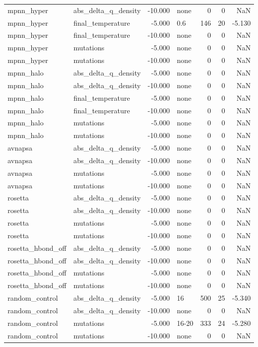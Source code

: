 \begin{table}
\begin{tabular}{llrlrrr}
mpnn\_hyper & abs\_delta\_q\_density & -10.000 & none & 0 & 0 & NaN \\
mpnn\_hyper & final\_temperature & -5.000 & 0.6 & 146 & 20 & -5.130 \\
mpnn\_hyper & final\_temperature & -10.000 & none & 0 & 0 & NaN \\
mpnn\_hyper & mutations & -5.000 & none & 0 & 0 & NaN \\
mpnn\_hyper & mutations & -10.000 & none & 0 & 0 & NaN \\
mpnn\_halo & abs\_delta\_q\_density & -5.000 & none & 0 & 0 & NaN \\
mpnn\_halo & abs\_delta\_q\_density & -10.000 & none & 0 & 0 & NaN \\
mpnn\_halo & final\_temperature & -5.000 & none & 0 & 0 & NaN \\
mpnn\_halo & final\_temperature & -10.000 & none & 0 & 0 & NaN \\
mpnn\_halo & mutations & -5.000 & none & 0 & 0 & NaN \\
mpnn\_halo & mutations & -10.000 & none & 0 & 0 & NaN \\
avnapsa & abs\_delta\_q\_density & -5.000 & none & 0 & 0 & NaN \\
avnapsa & abs\_delta\_q\_density & -10.000 & none & 0 & 0 & NaN \\
avnapsa & mutations & -5.000 & none & 0 & 0 & NaN \\
avnapsa & mutations & -10.000 & none & 0 & 0 & NaN \\
rosetta & abs\_delta\_q\_density & -5.000 & none & 0 & 0 & NaN \\
rosetta & abs\_delta\_q\_density & -10.000 & none & 0 & 0 & NaN \\
rosetta & mutations & -5.000 & none & 0 & 0 & NaN \\
rosetta & mutations & -10.000 & none & 0 & 0 & NaN \\
rosetta\_hbond\_off & abs\_delta\_q\_density & -5.000 & none & 0 & 0 & NaN \\
rosetta\_hbond\_off & abs\_delta\_q\_density & -10.000 & none & 0 & 0 & NaN \\
rosetta\_hbond\_off & mutations & -5.000 & none & 0 & 0 & NaN \\
rosetta\_hbond\_off & mutations & -10.000 & none & 0 & 0 & NaN \\
random\_control & abs\_delta\_q\_density & -5.000 & 16 & 500 & 25 & -5.340 \\
random\_control & abs\_delta\_q\_density & -10.000 & none & 0 & 0 & NaN \\
random\_control & mutations & -5.000 & 16-20 & 333 & 24 & -5.280 \\
random\_control & mutations & -10.000 & none & 0 & 0 & NaN \\
\bottomrule
\end{tabular}
\end{table}
